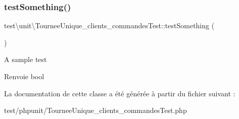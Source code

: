 \subsubsection{\texorpdfstring{test\+Something()}{testSomething()}}
{\footnotesize\ttfamily test\textbackslash{}unit\textbackslash{}\+Tournee\+Unique\+\_\+clients\+\_\+commandes\+Test\+::test\+Something (\begin{DoxyParamCaption}{ }\end{DoxyParamCaption})}

A sample test \begin{DoxyReturn}{Renvoie}
bool 
\end{DoxyReturn}


La documentation de cette classe a été générée à partir du fichier suivant \+:\begin{DoxyCompactItemize}
\item 
test/phpunit/Tournee\+Unique\+\_\+clients\+\_\+commandes\+Test.\+php\end{DoxyCompactItemize}
